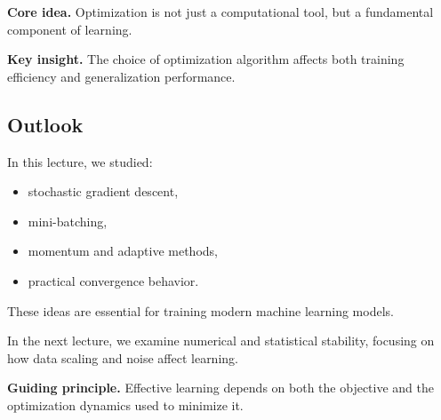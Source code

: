 \medskip

\noindent
\textbf{Core idea.}  
Optimization is not just a computational tool, but a fundamental component of learning.

\medskip

\noindent
\textbf{Key insight.}  
The choice of optimization algorithm affects both training efficiency and generalization performance.

\subsection{Outlook}

In this lecture, we studied:

\begin{itemize}
    \item stochastic gradient descent,
    \item mini-batching,
    \item momentum and adaptive methods,
    \item practical convergence behavior.
\end{itemize}

\medskip

\noindent
These ideas are essential for training modern machine learning models.

\medskip

\noindent
In the next lecture, we examine numerical and statistical stability, focusing on how data scaling and noise affect learning.

\medskip

\noindent
\textbf{Guiding principle.}  
Effective learning depends on both the objective and the optimization dynamics used to minimize it.